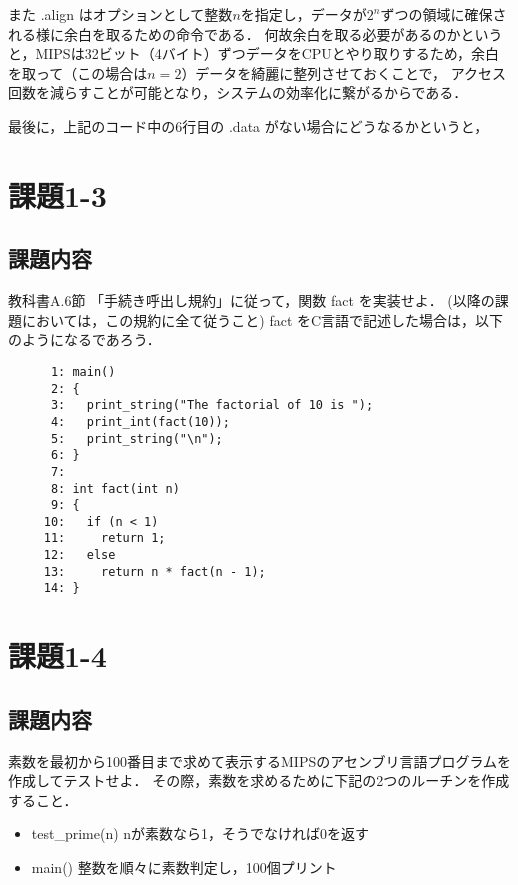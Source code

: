 \documentclass[a4j,11pt]{jarticle}
\begin{document}
また .align はオプションとして整数$n$を指定し，データが$2^{n}$ずつの領域に確保される様に余白を取るための命令である．
何故余白を取る必要があるのかというと，MIPSは32ビット（4バイト）ずつデータをCPUとやり取りするため，余白を取って（この場合は$n = 2$）データを綺麗に整列させておくことで，
アクセス回数を減らすことが可能となり，システムの効率化に繋がるからである．

最後に，上記のコード中の6行目の .data がない場合にどうなるかというと，

\section{課題1-3}

\subsection{課題内容}
教科書A.6節 「手続き呼出し規約」に従って，関数 fact を実装せよ．
(以降の課題においては，この規約に全て従うこと) fact をC言語で記述した場合は，以下のようになるであろう．
\begin{verbatim}
      1: main()
      2: {
      3:   print_string("The factorial of 10 is ");
      4:   print_int(fact(10));
      5:   print_string("\n");
      6: }
      7: 
      8: int fact(int n)
      9: {
     10:   if (n < 1)
     11:     return 1;
     12:   else
     13:     return n * fact(n - 1);
     14: }
\end{verbatim}

\section{課題1-4}
\subsection{課題内容}
素数を最初から100番目まで求めて表示するMIPSのアセンブリ言語プログラムを作成してテストせよ． 
その際，素数を求めるために下記の2つのルーチンを作成すること．

\begin{itemize}
      \item test\_prime(n)    nが素数なら1，そうでなければ0を返す
      \item main()       整数を順々に素数判定し，100個プリント
\end{itemize}
\end{document}
